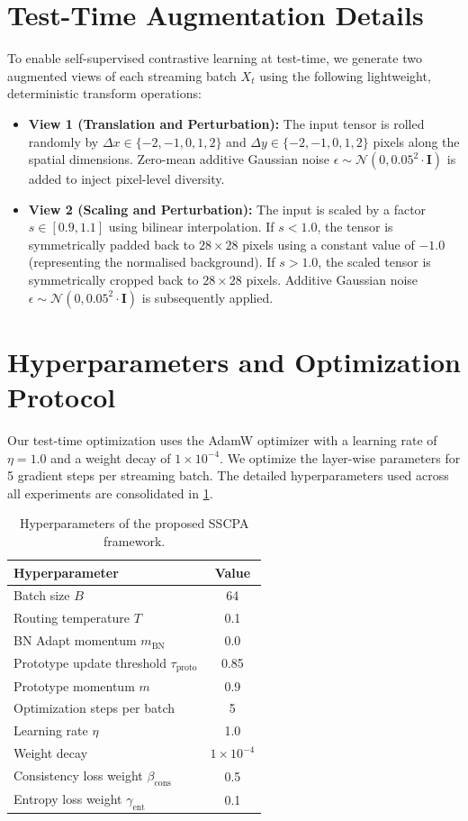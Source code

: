 \documentclass{article}
\theoremstyle{plain}
\theoremstyle{definition}
\theoremstyle{remark}
\begin{document}
\section{Test-Time Augmentation Details}
\label{appendix:augmentations}
To enable self-supervised contrastive learning at test-time, we generate two augmented views of each streaming batch $X_t$ using the following lightweight, deterministic transform operations:
\begin{itemize}
    \item \textbf{View 1 (Translation and Perturbation):} The input tensor is rolled randomly by $\Delta x \in \{-2, -1, 0, 1, 2\}$ and $\Delta y \in \{-2, -1, 0, 1, 2\}$ pixels along the spatial dimensions. Zero-mean additive Gaussian noise $\epsilon \sim \mathcal{N}(0, 0.05^2 \cdot \mathbf{I})$ is added to inject pixel-level diversity.
    \item \textbf{View 2 (Scaling and Perturbation):} The input is scaled by a factor $s \in [0.9, 1.1]$ using bilinear interpolation. If $s < 1.0$, the tensor is symmetrically padded back to $28 \times 28$ pixels using a constant value of $-1.0$ (representing the normalised background). If $s > 1.0$, the scaled tensor is symmetrically cropped back to $28 \times 28$ pixels. Additive Gaussian noise $\epsilon \sim \mathcal{N}(0, 0.05^2 \cdot \mathbf{I})$ is subsequently applied.
\end{itemize}

\section{Hyperparameters and Optimization Protocol}
\label{appendix:hyperparameters}
Our test-time optimization uses the AdamW optimizer with a learning rate of $\eta = 1.0$ and a weight decay of $1 \times 10^{-4}$. We optimize the layer-wise parameters for 5 gradient steps per streaming batch.
The detailed hyperparameters used across all experiments are consolidated in \cref{table:hyperparams}.

\begin{table}[h]
\centering
\caption{Hyperparameters of the proposed SSCPA framework.}
\label{table:hyperparams}
\vskip 0.1in
\begin{tabular}{lc}
\toprule
\textbf{Hyperparameter} & \textbf{Value} \\
\midrule
Batch size $B$ & 64 \\
Routing temperature $T$ & 0.1 \\
BN Adapt momentum $m_{\text{BN}}$ & 0.0 \\
Prototype update threshold $\tau_{\text{proto}}$ & 0.85 \\
Prototype momentum $m$ & 0.9 \\
Optimization steps per batch & 5 \\
Learning rate $\eta$ & 1.0 \\
Weight decay & $1 \times 10^{-4}$ \\
Consistency loss weight $\beta_{\text{cons}}$ & 0.5 \\
Entropy loss weight $\gamma_{\text{ent}}$ & 0.1 \\
\bottomrule
\end{tabular}
\end{table}
\end{document}
